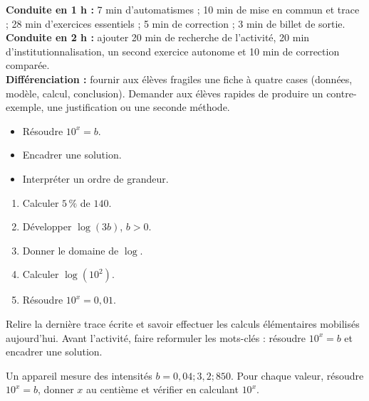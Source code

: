 \ifprof
\begin{methode}
\textbf{Conduite en 1 h :} 7 min d'automatismes ; 10 min de mise en commun et trace ; 28 min d'exercices essentiels ; 5 min de correction ; 3 min de billet de sortie.\\
\textbf{Conduite en 2 h :} ajouter 20 min de recherche de l'activité, 20 min d'institutionnalisation, un second exercice autonome et 10 min de correction comparée.\\
\textbf{Différenciation :} fournir aux élèves fragiles une fiche à quatre cases (données, modèle, calcul, conclusion). Demander aux élèves rapides de produire un contre-exemple, une justification ou une seconde méthode.
\end{methode}
\fi
{}
\begin{objectifs}\begin{itemize}\item Résoudre $10^x=b$.\item Encadrer une solution.\item Interpréter un ordre de grandeur.\end{itemize}\end{objectifs}
\begin{automatismes}\begin{enumerate}\item Calculer $5\,\%$ de $140$. \item Développer $\log(3b)$, $b>0$. \item Donner le domaine de $\log$. \rep{$]0,+\infty[$}\item Calculer $\log(10^2)$. \item Résoudre $10^x=0{,}01$. \end{enumerate}\end{automatismes}
\begin{prerequis}Relire la dernière trace écrite et savoir effectuer les calculs élémentaires mobilisés aujourd'hui. Avant l'activité, faire reformuler les mots-clés : résoudre $10^x=b$ et encadrer une solution.\end{prerequis}

\begin{activite}
Un appareil mesure des intensités $b=0{,}04;3{,}2;850$. Pour chaque valeur, résoudre $10^x=b$, donner $x$ au centième et vérifier en calculant $10^x$.

\end{activite}

